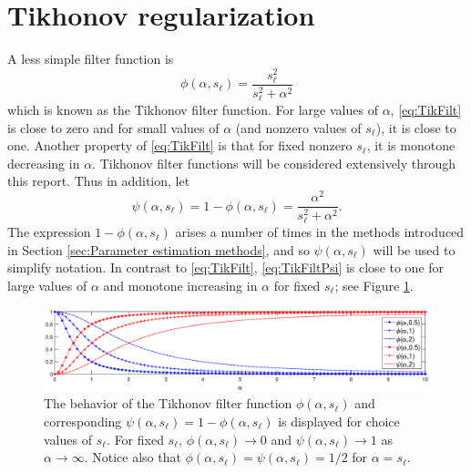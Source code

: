 \documentclass[12pt,notitlepage]{report}
\newcommand{\regparam}{\alpha}
\newcommand{\filt}{\phi}
\newcommand{\mfilt}{\psi}
\newcommand{\singular}{s}	%
\begin{document}
\section{Tikhonov regularization} \label{sec:Tikhonov reg.}

A less simple filter function is
\begin{equation}
\filt(\regparam,\singular_\ell)  = \frac{\singular_\ell^2}{\singular_\ell^2 + \regparam^2}
\label{eq:TikFilt}
\end{equation}
which is known as the Tikhonov filter function. For large values of $\regparam$, \eqref{eq:TikFilt} is close to zero and for small values of $\regparam$ (and nonzero values of $\singular_\ell$), it is close to one. Another property of \eqref{eq:TikFilt} is that for fixed nonzero $\singular_\ell$, it is monotone decreasing in $\regparam$. Tikhonov filter functions will be considered extensively through this report. Thus in addition, let
\begin{equation}
\mfilt(\regparam,\singular_\ell) = 1 - \filt(\regparam,\singular_\ell) = \frac{\regparam^2}{\singular_\ell^2 + \regparam^2}.
\label{eq:TikFiltPsi}
\end{equation}
The expression $1 - \filt(\regparam,\singular_\ell)$ arises a number of times in the methods introduced in Section \ref{sec:Parameter estimation methods}, and so $\mfilt(\regparam,\singular_\ell)$ will be used to simplify notation. In contrast to \eqref{eq:TikFilt}, \eqref{eq:TikFiltPsi} is close to one for large values of $\regparam$ and monotone increasing in $\regparam$ for fixed $\singular_\ell$; see Figure \ref{fig:Phi Psi Plot}. \par 

\begin{figure}
	\centerline{\includegraphics[scale = 0.4]{Figures/Phi_Psi_Plot.eps}}
\caption{The behavior of the Tikhonov filter function $\filt(\regparam,\singular_\ell)$ and corresponding $\mfilt(\regparam,\singular_\ell) = 1 - \filt(\regparam,\singular_\ell)$ is displayed for choice values of $\singular_\ell$. For fixed $\singular_\ell$, $\filt(\regparam,\singular_\ell) \rightarrow 0$ and $\mfilt(\regparam,\singular_\ell) \rightarrow 1$ as $\regparam \rightarrow \infty$. Notice also that $\filt(\regparam,\singular_\ell) = \mfilt(\regparam,\singular_\ell) = 1/2$ for $\alpha = \singular_\ell$.}
\label{fig:Phi Psi Plot}
\end{figure}
\end{document}
